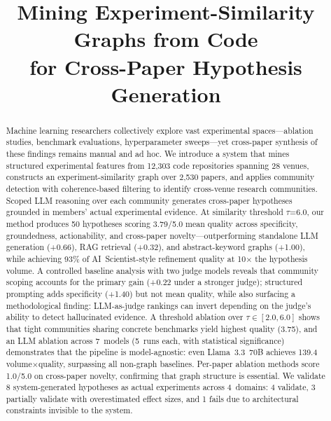 \documentclass[conference]{IEEEtran}
\begin{document}
\title{Mining Experiment-Similarity Graphs from Code\\for Cross-Paper Hypothesis Generation}

\author{
\and
{}
}

\maketitle

\begin{abstract}
Machine learning researchers collectively explore vast experimental spaces---ablation studies, benchmark evaluations, hyperparameter sweeps---yet cross-paper synthesis of these findings remains manual and ad hoc.
We introduce a system that mines structured experimental features from 12{,}303 code repositories spanning 28 venues, constructs an experiment-similarity graph over 2{,}530 papers, and applies community detection with coherence-based filtering to identify cross-venue research communities.
Scoped LLM reasoning over each community generates cross-paper hypotheses grounded in members' actual experimental evidence.
At similarity threshold $\tau$=6.0, our method produces 50 hypotheses scoring 3.79/5.0 mean quality across specificity, groundedness, actionability, and cross-paper novelty---outperforming standalone LLM generation (+0.66), RAG retrieval (+0.32), and abstract-keyword graphs (+1.00), while achieving 93\% of AI~Scientist-style refinement quality at 10$\times$ the hypothesis volume.
A controlled baseline analysis with two judge models reveals that community scoping accounts for the primary gain (+0.22 under a stronger judge); structured prompting adds specificity (+1.40) but not mean quality, while also surfacing a methodological finding: LLM-as-judge rankings can invert depending on the judge's ability to detect hallucinated evidence.
A threshold ablation over $\tau \in [2.0, 6.0]$ shows that tight communities sharing concrete benchmarks yield highest quality (3.75), and an LLM ablation across 7~models (5~runs each, with statistical significance) demonstrates that the pipeline is model-agnostic: even Llama~3.3~70B achieves 139.4 volume$\times$quality, surpassing all non-graph baselines.
Per-paper ablation methods score 1.0/5.0 on cross-paper novelty, confirming that graph structure is essential.
We validate 8 system-generated hypotheses as actual experiments across 4~domains: 4 validate, 3 partially validate with overestimated effect sizes, and 1 fails due to architectural constraints invisible to the system.
\end{abstract}
\end{document}
